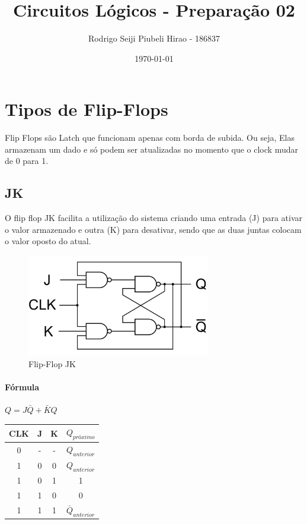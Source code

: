 \documentclass{article}
\title{Circuitos Lógicos - Preparação 02}
\author{
    Rodrigo Seiji Piubeli Hirao - 186837
}
\date{\today}
\begin{document}
    \maketitle
    \newpage
    \tableofcontents
    \newpage
    \listoffigures
    \newpage

    \section{Tipos de Flip-Flops}

        Flip Flops são Latch que funcionam apenas com borda de subida. Ou seja, Elas armazenam um dado e só podem ser atualizadas no momento que o clock mudar de 0 para 1.

        \subsection{JK}

            O flip flop JK facilita a utilização do sistema criando uma entrada (J) para ativar o valor armazenado e outra (K) para desativar, sendo que as duas juntas colocam o valor oposto do atual.

            \begin{figure} [H] 
                \includegraphics[width=8cm]{flipflop-jk.png}
                \caption{Flip-Flop JK}
                \label{fig:flipflop-jk}
            \end{figure}

            \paragraph{Fórmula}
            $Q = J\bar{Q} + \bar{K}Q$
            \newline
            \newline
            \begin{tabular}{||c c c c||}
                \hline
                CLK &   J   &   K   &   $Q_{próximo}$       \\
                \hline\hline
                0   &   -   &   -   &   $Q_{anterior}$      \\
                1   &   0   &   0   &   $Q_{anterior}$      \\
                1   &   0   &   1   &   1                   \\
                1   &   1   &   0   &   0                   \\
                1   &   1   &   1   &   $\bar{Q}_{anterior}$\\
                \hline
            \end{tabular}
\end{document}
